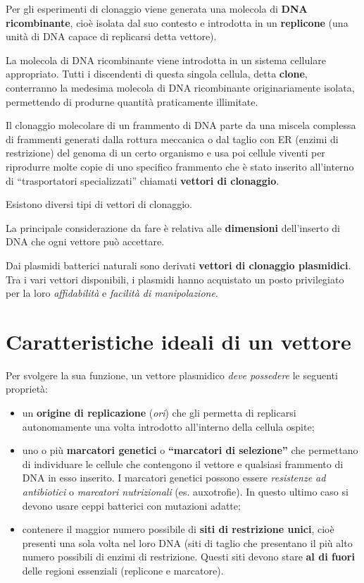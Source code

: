 \documentclass[11pt]{book}
\begin{document}
Per gli esperimenti di clonaggio viene generata una molecola di
\textbf{DNA ricombinante}, cioè isolata dal suo contesto e introdotta in
un \textbf{replicone} (una unità di DNA capace di replicarsi detta
vettore).

La molecola di DNA ricombinante viene introdotta in un sistema cellulare
appropriato. Tutti i discendenti di questa singola cellula, detta
\textbf{clone}, conterranno la medesima molecola di DNA ricombinante
originariamente isolata, permettendo di produrne quantità praticamente
illimitate.

Il clonaggio molecolare di un frammento di DNA parte da una miscela
complessa di frammenti generati dalla rottura meccanica o dal taglio con
ER (enzimi di restrizione) del genoma di un certo organismo e usa poi
cellule viventi per riprodurre molte copie di uno specifico frammento
che è stato inserito all'interno di ``trasportatori specializzati''
chiamati \textbf{vettori di clonaggio}.

Esistono diversi tipi di vettori di clonaggio.

La principale considerazione da fare è relativa alle \textbf{dimensioni}
dell'inserto di DNA che ogni vettore può accettare.

Dai plasmidi batterici naturali sono derivati \textbf{vettori di
clonaggio plasmidici}. Tra i vari vettori disponibili, i plasmidi hanno
acquistato un posto privilegiato per la loro \emph{affidabilità} e
\emph{facilità di manipolazione}.

\section{Caratteristiche ideali di un
vettore}\label{caratteristiche-ideali-di-un-vettore}

Per svolgere la sua funzione, un vettore plasmidico \emph{deve
possedere} le seguenti proprietà:

\begin{itemize}
\itemsep1pt\parskip0pt
\item
  un \textbf{origine di replicazione} (\emph{ori}) che gli permetta di
  replicarsi autonomamente una volta introdotto all'interno della
  cellula ospite;
\item
  uno o più \textbf{marcatori genetici} o \textbf{``marcatori di
  selezione''} che permettano di individuare le cellule che contengono
  il vettore e qualsiasi frammento di DNA in esso inserito. I marcatori
  genetici possono essere \emph{resistenze ad antibiotici} o
  \emph{marcatori nutrizionali} (es. auxotrofie). In questo ultimo caso
  si devono usare ceppi batterici con mutazioni adatte;
\item
  contenere il maggior numero possibile di \textbf{siti di restrizione
  unici}, cioè presenti una sola volta nel loro DNA (siti di taglio che
  presentano il più alto numero possibili di enzimi di restrizione.
  Questi siti devono stare \textbf{al di fuori} delle regioni essenziali
  (replicone e marcatore).
\end{itemize}
\end{document}
